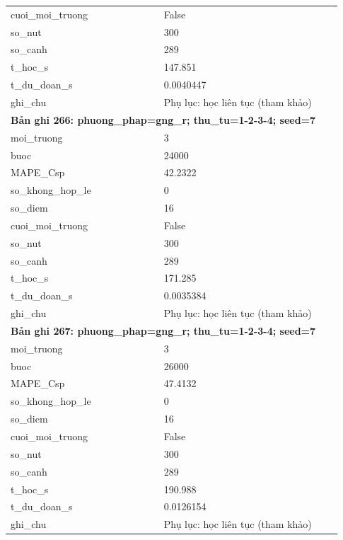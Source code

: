 \begin{longtable}{p{0.43\linewidth}p{0.50\linewidth}}
cuoi\_\allowbreak moi\_\allowbreak truong & False \\
so\_\allowbreak nut & 300 \\
so\_\allowbreak canh & 289 \\
t\_\allowbreak hoc\_\allowbreak s & 147.851 \\
t\_\allowbreak du\_\allowbreak doan\_\allowbreak s & 0.0040447 \\
ghi\_\allowbreak chu & Phụ lục: học liên tục (tham khảo) \\
\midrule
\multicolumn{2}{p{0.95\linewidth}}{\textbf{Bản ghi 266: phuong\_phap=gng\_r; thu\_tu=1-2-3-4; seed=7}} \\
moi\_\allowbreak truong & 3 \\
buoc & 24000 \\
MAPE\_\allowbreak Csp & 42.2322 \\
so\_\allowbreak khong\_\allowbreak hop\_\allowbreak le & 0 \\
so\_\allowbreak diem & 16 \\
cuoi\_\allowbreak moi\_\allowbreak truong & False \\
so\_\allowbreak nut & 300 \\
so\_\allowbreak canh & 289 \\
t\_\allowbreak hoc\_\allowbreak s & 171.285 \\
t\_\allowbreak du\_\allowbreak doan\_\allowbreak s & 0.0035384 \\
ghi\_\allowbreak chu & Phụ lục: học liên tục (tham khảo) \\
\midrule
\multicolumn{2}{p{0.95\linewidth}}{\textbf{Bản ghi 267: phuong\_phap=gng\_r; thu\_tu=1-2-3-4; seed=7}} \\
moi\_\allowbreak truong & 3 \\
buoc & 26000 \\
MAPE\_\allowbreak Csp & 47.4132 \\
so\_\allowbreak khong\_\allowbreak hop\_\allowbreak le & 0 \\
so\_\allowbreak diem & 16 \\
cuoi\_\allowbreak moi\_\allowbreak truong & False \\
so\_\allowbreak nut & 300 \\
so\_\allowbreak canh & 289 \\
t\_\allowbreak hoc\_\allowbreak s & 190.988 \\
t\_\allowbreak du\_\allowbreak doan\_\allowbreak s & 0.0126154 \\
ghi\_\allowbreak chu & Phụ lục: học liên tục (tham khảo) \\

\end{longtable}

